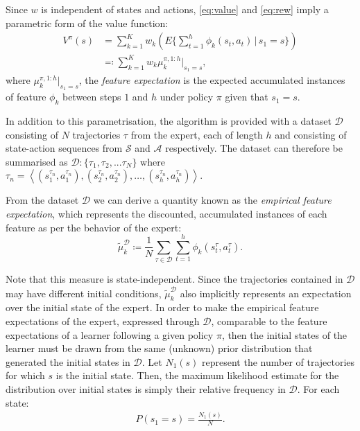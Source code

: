 \documentclass[letterpaper]{article}
\begin{document}
Since $w$ is independent of states and actions, \eqref{eq:value} and \eqref{eq:rew} imply a parametric form of the value function:
\begin{align}
 	V^{\pi}(s) &= \sum^K_{k=1}w_k\left(E\{\sum_{t = 1}^h\phi_k(s_t,a_t)\,\vert\, s_1 = s\}\right)\\
&\eqqcolon\sum^K_{k=1}w_k\mu^{\pi, 1:h}_k|_{s_1=s},\label{eq:parametrized_value}
\end{align}
where $\mu^{\pi,1:h}_k|_{s_1=s}$, the \emph{feature expectation} is the expected accumulated instances of feature $\phi_k$ between steps $1$ and $h$ under policy $\pi$  given that $s_1 = s$.

In addition to this parametrisation, the algorithm is provided with a dataset ${\mathcal{D}}$ consisting of $N$ trajectories $\tau$ from the expert, each of length $h$ and consisting of state-action sequences from $\mathcal{S}$ and $\mathcal{A}$ respectively. The dataset can therefore be summarised as $\mathcal{D}:\big\{ \tau_1,\tau_2,...\tau_N \big\}$ where $\tau_n = \left<(s^{\tau_n}_1,a^{\tau_n}_1),(s^{\tau_n}_2,a^{\tau_n}_2),\ldots,(s^{\tau_n}_{h},a^{\tau_n}_{h})\right>$.

From the dataset ${\mathcal{D}}$ we can derive a quantity known as the \emph{empirical feature expectation}, which represents the discounted, accumulated instances of each feature as per the behavior of the expert:
\begin{equation}
	\widetilde{\mu}^{\mathcal{D}}_k \coloneqq\frac{1}{N}\sum_{\tau\in\mathcal{D}}\sum_{t=1}^{h}\phi_k(s^\tau_t,a^\tau_t). \label{eqn:empirical_fe}
\end{equation}

Note that this measure is state-independent. Since the trajectories contained in $\mathcal{D}$ may have different initial conditions, $\widetilde{\mu}^{\mathcal{D}}_k$ also implicitly represents an expectation over the initial state of the expert. In order to make the empirical feature expectations of the expert, expressed through $\mathcal{D}$, comparable to the feature expectations of a learner following a given policy $\pi$, then the initial states of the learner must be drawn from the same (unknown) prior distribution that generated the initial states in $\mathcal{D}$. Let $N_1(s)$ represent the number of trajectories for which $s$ is the initial state. Then, the maximum likelihood estimate for the distribution over initial states is simply their relative frequency in $\mathcal{D}$. For each state:
\begin{align}
  \label{eq:initial_belief}
  P(s_1 = s)= \frac{N_1(s)}{N}.
\end{align}
\end{document}
